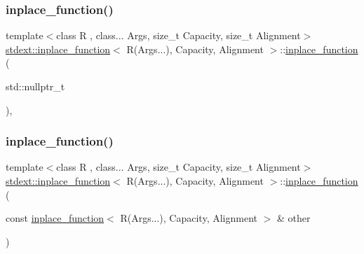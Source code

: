\subsubsection{\texorpdfstring{inplace\+\_\+function()}{inplace\_function()}\hspace{0.1cm}{\footnotesize\ttfamily [12/14]}}
{\footnotesize\ttfamily template$<$class R , class... Args, size\+\_\+t Capacity, size\+\_\+t Alignment$>$ \\
\hyperlink{classstdext_1_1inplace__function}{stdext\+::inplace\+\_\+function}$<$ R(Args...), Capacity, Alignment $>$\+::\hyperlink{classstdext_1_1inplace__function}{inplace\+\_\+function} (\begin{DoxyParamCaption}\item[{std\+::nullptr\+\_\+t}]{ }\end{DoxyParamCaption})\hspace{0.3cm}{\ttfamily [inline]}, {\ttfamily [noexcept]}}

\mbox{\label{classstdext_1_1inplace__function_3_01R_07Args_8_8_8_08_00_01Capacity_00_01Alignment_01_4_a1ccbc60554d934faf7c8e4188f6141b0}} 
\subsubsection{\texorpdfstring{inplace\+\_\+function()}{inplace\_function()}\hspace{0.1cm}{\footnotesize\ttfamily [13/14]}}
{\footnotesize\ttfamily template$<$class R , class... Args, size\+\_\+t Capacity, size\+\_\+t Alignment$>$ \\
\hyperlink{classstdext_1_1inplace__function}{stdext\+::inplace\+\_\+function}$<$ R(Args...), Capacity, Alignment $>$\+::\hyperlink{classstdext_1_1inplace__function}{inplace\+\_\+function} (\begin{DoxyParamCaption}\item[{const \hyperlink{classstdext_1_1inplace__function}{inplace\+\_\+function}$<$ R(Args...), Capacity, Alignment $>$ \&}]{other }\end{DoxyParamCaption})\hspace{0.3cm}{\ttfamily [inline]}}

